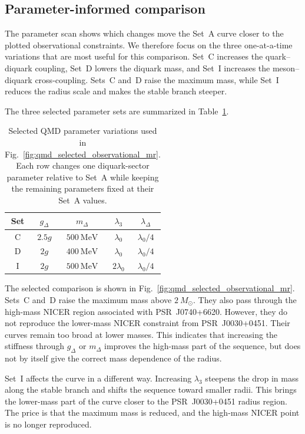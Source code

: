 \subsection*{Parameter-informed comparison}
\label{subsec:qmd_selected_obs}

The parameter scan shows which changes move the Set~A curve closer to
the plotted observational constraints. We therefore focus on the three
one-at-a-time variations that are most useful for this comparison.
Set~C increases the quark--diquark coupling, Set~D lowers the diquark
mass, and Set~I increases the meson--diquark cross-coupling. Sets~C
and~D raise the maximum mass, while Set~I reduces the radius scale and
makes the stable branch steeper.

The three selected parameter sets are summarized in
Table~\ref{tab:qmd_selected_obs_runs}.

\begin{table}[H]
\centering
\small
\begin{tabular}{c c c c c}
\hline
Set & \(g_\Delta\) & \(m_\Delta\) & \(\lambda_3\) & \(\lambda_\Delta\) \\
\hline
C & \(2.5g\) & \(500~\mathrm{MeV}\) & \(\lambda_0\) & \(\lambda_0/4\) \\
D & \(2g\) & \(400~\mathrm{MeV}\) & \(\lambda_0\) & \(\lambda_0/4\) \\
I & \(2g\) & \(500~\mathrm{MeV}\) & \(2\lambda_0\) & \(\lambda_0/4\) \\
\hline
\end{tabular}
\caption{Selected QMD parameter variations used in
Fig.~\ref{fig:qmd_selected_observational_mr}. Each row changes one
diquark-sector parameter relative to Set~A while keeping the
remaining parameters fixed at their Set~A values.}
\label{tab:qmd_selected_obs_runs}
\end{table}

The selected comparison is shown in
Fig.~\ref{fig:qmd_selected_observational_mr}. Sets~C and~D raise the
maximum mass above \(2~M_\odot\). They also pass through the high-mass
NICER region associated with PSR~J0740+6620. However, they do not
reproduce the lower-mass NICER constraint from PSR~J0030+0451. Their
curves remain too broad at lower masses. This indicates that increasing
the stiffness through \(g_\Delta\) or \(m_\Delta\) improves the
high-mass part of the sequence, but does not by itself give the correct
mass dependence of the radius.

Set~I affects the curve in a different way. Increasing \(\lambda_3\)
steepens the drop in mass along the stable branch and shifts the
sequence toward smaller radii. This brings the lower-mass part of the
curve closer to the PSR~J0030+0451 radius region. The price is that the
maximum mass is reduced, and the high-mass NICER point is no longer
reproduced.

